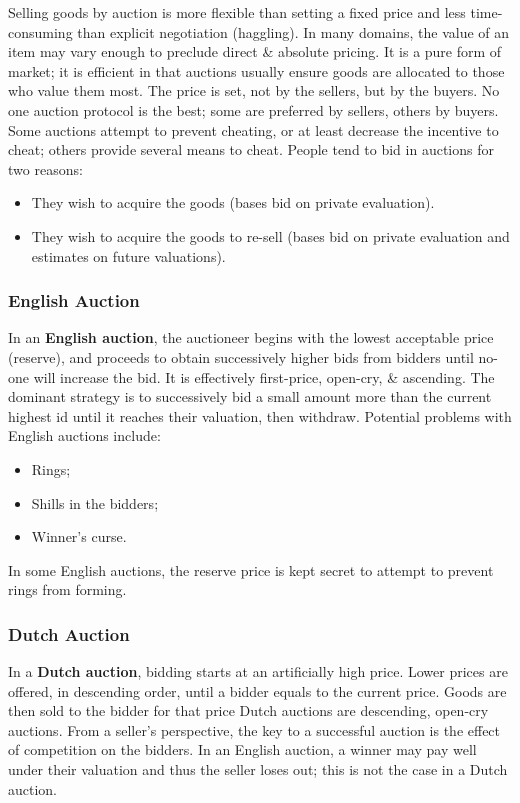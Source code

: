 \documentclass[a4paper,11pt]{article}
\begin{document}
Selling goods by auction is more flexible than setting a fixed price and less time-consuming than explicit negotiation (haggling).
In many domains, the value of an item may vary enough to preclude direct \& absolute pricing.
It is a pure form of market;
it is efficient in that auctions usually ensure goods are allocated to those who value them most.
The price is set, not by the sellers, but by the buyers.
No one auction protocol is the best;
some are preferred by sellers, others by buyers.
Some auctions attempt to prevent cheating, or at least decrease the incentive to cheat;
others provide several means to cheat.
People tend to bid in auctions for two reasons:
\begin{itemize}
    \item   They wish to acquire the goods (bases bid on private evaluation).
    \item   They wish to acquire the goods to re-sell (bases bid on private evaluation and estimates on future valuations).
\end{itemize}

\subsubsection{English Auction}
In an \textbf{English auction}, the auctioneer begins with the lowest acceptable price (reserve), and proceeds to obtain successively higher bids from bidders until no-one will increase the bid.
It is effectively first-price, open-cry, \& ascending.
The dominant strategy is to successively bid a small amount more than the current highest id until it reaches their valuation, then withdraw.
Potential problems with English auctions include:
\begin{itemize}
    \item   Rings;
    \item   Shills in the bidders;
    \item   Winner's curse.
\end{itemize}

In some English auctions, the reserve price is kept secret to attempt to prevent rings from forming.

\subsubsection{Dutch Auction}
In a \textbf{Dutch auction}, bidding starts at an artificially high price.
Lower prices are offered, in descending order, until a bidder equals to the current price.
Goods are then sold to the bidder for that price
Dutch auctions are descending, open-cry auctions.
From a seller's perspective, the key to a successful auction is the effect of competition on the bidders.
In an English auction, a winner may pay well under their valuation and thus the seller loses out;
this is not the case in a Dutch auction.
\end{document}
